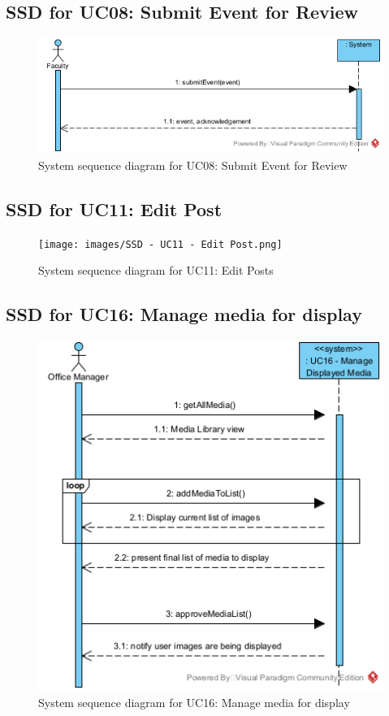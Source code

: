 \documentclass{article}
\begin{document}
\subsection{SSD for UC08: Submit Event for Review}
\begin{figure}[H]
    \centering
    \includegraphics[scale=1.0]{images/SSD - UC08 - Submit for review.png}
    \caption{System sequence diagram for UC08: Submit Event for Review}
    \label{fig:enter-label}
\end{figure}
\subsection{SSD for UC11: Edit Post}
\begin{figure}[H]
    \centering
    \texttt{[image: images/SSD - UC11 - Edit Post.png]}
    \caption{System sequence diagram for UC11: Edit Posts}
    \label{fig:enter-label}
\end{figure}
\subsection{SSD for UC16: Manage media for display}
\begin{figure}[H]
    \centering
    \includegraphics[scale=1.0]{images/SSD - UC16 - Manage Displayed Media.png}
    \caption{System sequence diagram for UC16: Manage media for display}
    \label{fig:enter-label}
\end{figure}
\end{document}
